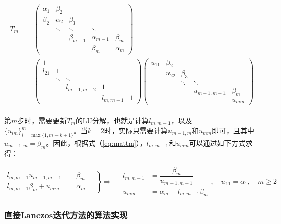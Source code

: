 \documentclass[UTF8,nofonts]{ctexart}
\begin{document}
\begin{align}
\label{eq:mattm}
\begin{split}
T_m&=\begin{pmatrix}
\alpha_1 & \beta_2 & & & \\
\beta_2 & \alpha_2 & \beta_3 & & \\
& \ddots & \ddots & \ddots & \\
& & \beta_{m-1} & \alpha_{m-1} & \beta_m \\
& & & \beta_m & \alpha_m
\end{pmatrix} \\
&=\begin{pmatrix}
1 & & & & \\
l_{21} & 1 & & & \\
& \ddots & \ddots & & \\
& & l_{m-1,m-2} & 1 & \\
& & & l_{m,m-1} & 1
\end{pmatrix}
\begin{pmatrix}
u_{11} & \beta_2 & & & \\
& u_{22} & \beta_3 & & \\
& & \ddots & \ddots & \\
& & & u_{m-1,m-1} & \beta_m \\
& & & & u_{mm}
\end{pmatrix}
\end{split}
\end{align}

第$m$步时，需要更新$T_m$的LU分解，也就是计算$l_{m,m-1}$，以及$\{u_{im}\}_{i=\max\{1,m-k+1\}}^m$。当$k=2$时，实际只需要计算$u_{m-1,m}$和$u_{mm}$即可，且其中$u_{m-1,m}=\beta_m$。因此，根据式（\ref{eq:mattm}），$l_{m,m-1}$和$u_{mm}$可以通过如下方式求得：

\begin{equation}
\label{eq:lu}
\left.
\begin{aligned}
l_{m,m-1}u_{m-1,m-1}&=\beta_m \\
l_{m,m-1}\beta_m+u_{mm}&=\alpha_m
\end{aligned}\quad\right\}\Longrightarrow\quad
\begin{aligned}
l_{m,m-1}&=\dfrac{\beta_m}{u_{m-1,m-1}} \\
u_{mm}&=\alpha_m-l_{m,m-1}\beta_m
\end{aligned},\quad
u_{11}=\alpha_1,\quad m\geq 2
\end{equation}

\subsubsection*{直接Lanczos迭代方法的算法实现}
\end{document}
